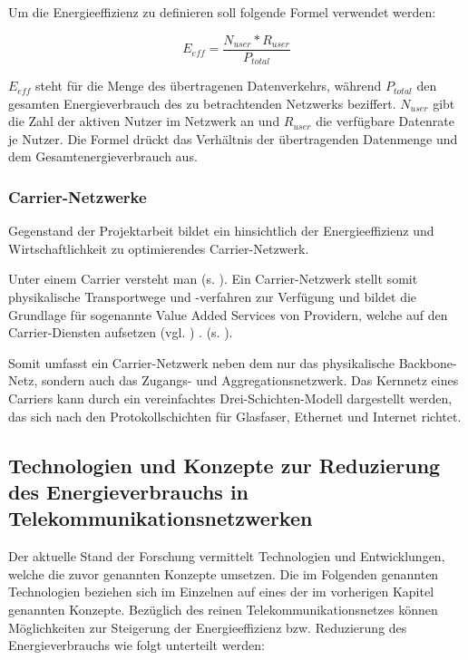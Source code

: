 Um die Energieeffizienz zu definieren soll folgende Formel verwendet werden:

\begin{equation}
E_{eff}=\frac{N_{user}*R_{user}}{P_{total}}
\end{equation}

$E_{eff}$ steht für die Menge des übertragenen Datenverkehrs, während $P_{total}$ den gesamten Energieverbrauch des zu betrachtenden Netzwerks beziffert. $N_{user}$ gibt die Zahl der aktiven Nutzer im Netzwerk an und $R_{user}$ die verfügbare Datenrate je Nutzer. \cite{aleksic2013}
Die Formel drückt das Verhältnis der übertragenden Datenmenge und dem Gesamtenergieverbrauch aus.


\subsubsection{Carrier-Netzwerke}
Gegenstand der Projektarbeit bildet ein hinsichtlich der Energieeffizienz und Wirtschaftlichkeit zu optimierendes Carrier-Netzwerk.

Unter einem Carrier versteht man  (s. \cite{carrier}). Ein Carrier-Netzwerk stellt somit physikalische Transportwege und -verfahren zur Verfügung und bildet die Grundlage für sogenannte Value Added Services von Providern, welche auf den Carrier-Diensten aufsetzen (vgl. \cite{fassnacht}) .  (s. \cite{fassnacht}).

Somit umfasst ein Carrier-Netzwerk neben dem nur das physikalische Backbone-Netz, sondern auch das Zugangs- und Aggregationsnetzwerk. Das Kernnetz eines Carriers kann durch ein vereinfachtes Drei-Schichten-Modell dargestellt werden, das sich nach den Protokollschichten für Glasfaser, Ethernet und Internet richtet. 



\subsection{Technologien und Konzepte zur Reduzierung des Energieverbrauchs in Telekommunikationsnetzwerken}
Der aktuelle Stand der Forschung vermittelt Technologien und Entwicklungen, welche die zuvor genannten Konzepte umsetzen. Die im Folgenden genannten Technologien beziehen sich im Einzelnen auf eines der im vorherigen Kapitel genannten Konzepte. Bezüglich des reinen Telekommunikationsnetzes können Möglichkeiten zur Steigerung der Energieeffizienz bzw. Reduzierung des Energieverbrauchs wie folgt unterteilt werden:

